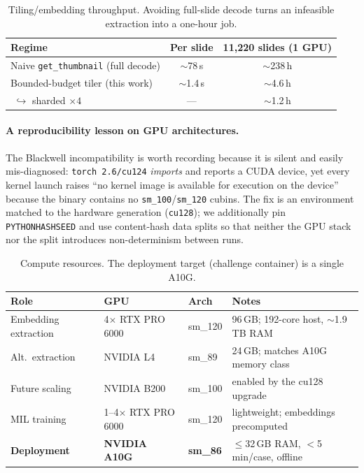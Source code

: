 \documentclass[11pt,a4paper]{article}
\newcommand{\code}[1]{\texttt{\small #1}}
\begin{document}
\begin{table}[h]
\centering
\caption{Tiling/embedding throughput. Avoiding full-slide decode turns an infeasible extraction
into a one-hour job.}
\label{tab:throughput}
\begin{tabular}{lcc}
\toprule
Regime & Per slide & 11{,}220 slides (1 GPU) \\
\midrule
Naive \code{get\_thumbnail} (full decode) & $\sim$78\,s & $\sim$238\,h \\
Bounded-budget tiler (this work) & $\sim$1.4\,s & $\sim$4.6\,h \\
\,\,$\hookrightarrow$ sharded $\times 4$ & --- & $\sim$1.2\,h \\
\bottomrule
\end{tabular}
\end{table}

\paragraph{A reproducibility lesson on GPU architectures.} The Blackwell incompatibility is worth
recording because it is silent and easily mis-diagnosed: \code{torch~2.6/cu124} \emph{imports}
and reports a CUDA device, yet every kernel launch raises ``no kernel image is available for
execution on the device'' because the binary contains no \code{sm\_100}/\code{sm\_120} cubins.
The fix is an environment matched to the hardware generation (\code{cu128}); we additionally pin
\code{PYTHONHASHSEED} and use content-hash data splits so that neither the GPU stack nor the
split introduces non-determinism between runs.

\begin{table}[h]
\centering
\caption{Compute resources. The deployment target (challenge container) is a single A10G.}
\label{tab:hw}
\begin{tabular}{llll}
\toprule
Role & GPU & Arch & Notes \\
\midrule
Embedding extraction & 4$\times$ RTX PRO 6000 & sm\_120 & 96\,GB; 192-core host, $\sim$1.9\,TB RAM \\
Alt.\ extraction & NVIDIA L4 & sm\_89 & 24\,GB; matches A10G memory class \\
Future scaling & NVIDIA B200 & sm\_100 & enabled by the cu128 upgrade \\
MIL training & 1--4$\times$ RTX PRO 6000 & sm\_120 & lightweight; embeddings precomputed \\
\textbf{Deployment} & \textbf{NVIDIA A10G} & \textbf{sm\_86} & $\le$32\,GB RAM, $<$5\,min/case, offline \\
\bottomrule
\end{tabular}
\end{table}
\end{document}
